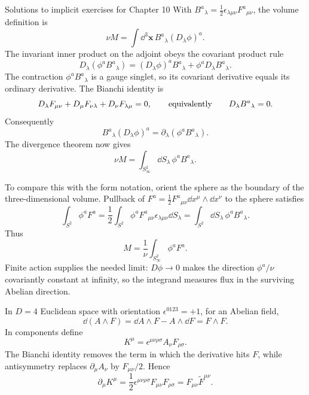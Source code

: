 \begin{bankssolutions}{Solutions to implicit exercises for Chapter 10}
With $B^a{}_\lambda=\tfrac12\epsilon_{\lambda\mu\nu}F^a{}_{\mu\nu}$, the volume
definition is
\[
  \nu M=\int\dd^3\mathbf x\,B^a{}_\lambda(D_\lambda\phi)^a.
\]
The invariant inner product on the adjoint obeys the covariant product rule
\[
  D_\lambda(\phi^aB^a{}_\lambda)
  =(D_\lambda\phi)^aB^a{}_\lambda
   +\phi^a D_\lambda B^a{}_\lambda.
\]
The contraction $\phi^aB^a{}_\lambda$ is a gauge singlet, so its covariant
derivative equals its ordinary derivative.  The Bianchi identity is
\[
  D_\lambda F_{\mu\nu}+D_\mu F_{\nu\lambda}
  +D_\nu F_{\lambda\mu}=0,
  \qquad\hbox{equivalently}\qquad
  D_\lambda B^a{}_\lambda=0.
\]
Consequently
\[
  B^a{}_\lambda(D_\lambda\phi)^a
  =\partial_\lambda(\phi^aB^a{}_\lambda).
\]
The divergence theorem now gives
\[
  \nu M=\int_{S^2_\infty}\dd S_\lambda\,\phi^aB^a{}_\lambda.
\]

To compare this with the form notation, orient the sphere as the boundary of
the three-dimensional volume.  Pullback of
$F^a=\tfrac12F^a{}_{\mu\nu}\dd x^\mu\wedge\dd x^\nu$ to the sphere satisfies
\[
  \int_{S^2}\phi^aF^a
  =\frac12\int_{S^2}\phi^aF^a{}_{\mu\nu}
    \epsilon_{\lambda\mu\nu}\dd S_\lambda
  =\int_{S^2}\dd S_\lambda\,\phi^aB^a{}_\lambda.
\]
Thus
\[
  M=\frac1{\nu}\int_{S^2_\infty}\phi^aF^a.
\]
Finite action supplies the needed limit: $D\phi\to0$ makes the direction
$\phi^a/\nu$ covariantly constant at infinity, so the integrand measures flux
in the surviving Abelian direction.

In $D=4$ Euclidean space with orientation $\epsilon^{0123}=+1$, for an Abelian
field,
\[
  \dd(A\wedge F)=\dd A\wedge F-A\wedge\dd F=F\wedge F.
\]
In components define
\[
  K^\mu=\epsilon^{\mu\nu\rho\sigma}A_\nu F_{\rho\sigma}.
\]
The Bianchi identity removes the term in which the derivative hits $F$, while
antisymmetry replaces $\partial_\mu A_\nu$ by
$F_{\mu\nu}/2$.  Hence
\[
  \partial_\mu K^\mu
  =\frac12\epsilon^{\mu\nu\rho\sigma}
    F_{\mu\nu}F_{\rho\sigma}
  =F_{\mu\nu}\widetilde F^{\mu\nu}.
\]


\end{bankssolutions}
